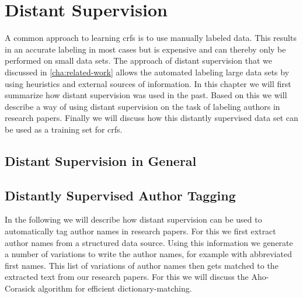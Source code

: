 \chapter{Distant Supervision}\label{cha:distant-supervision}

A common approach to learning \glspl{crf} is to use manually labeled data.
This results in an accurate labeling in most cases but is expensive and can thereby only be performed on small data sets.
The approach of \gls{distant supervision} that we discussed in \cref{cha:related-work} allows the automated labeling large data sets by using heuristics and external sources of information.
In this chapter we will first summarize how \gls{distant supervision} was used in the past. Based on this we will describe a way of using \gls{distant supervision} on the task of labeling authors in research papers. Finally we will discuss how this distantly supervised data set can be used as a training set for \glspl{crf}.\\

%

\section{Distant Supervision in General}
\section{Distantly Supervised Author Tagging}

In the following we will describe how distant supervision can be used to automatically tag author names in research papers.
For this we first extract author names from a structured data source.
Using this information we generate a number of variations to write the author names, for example with abbreviated first names.
This list of variations of author names then gets matched to the extracted text from our research papers.
For this we will discuss the Aho-Corasick algorithm for efficient dictionary-matching.

